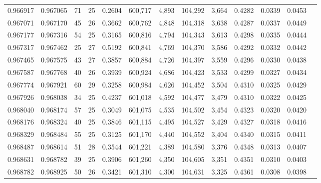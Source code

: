 \begin{tabular}{rrrrrrrrrrrrr}
0.966917 & 0.967065 &    71 &  25 &                                     0.2604 & 600,717 &   4,893 & 104,292 &   3,664 & 0.4282 & 0.0339 & 0.0453 \\
0.967071 & 0.967170 &    45 &  26 &                                     0.3662 & 600,762 &   4,848 & 104,318 &   3,638 & 0.4287 & 0.0337 & 0.0449 \\
0.967177 & 0.967316 &    54 &  25 &                                     0.3165 & 600,816 &   4,794 & 104,343 &   3,613 & 0.4298 & 0.0335 & 0.0444 \\
0.967317 & 0.967462 &    25 &  27 &                                     0.5192 & 600,841 &   4,769 & 104,370 &   3,586 & 0.4292 & 0.0332 & 0.0442 \\
0.967465 & 0.967575 &    43 &  27 &                                     0.3857 & 600,884 &   4,726 & 104,397 &   3,559 & 0.4296 & 0.0330 & 0.0438 \\
0.967587 & 0.967768 &    40 &  26 &                                     0.3939 & 600,924 &   4,686 & 104,423 &   3,533 & 0.4299 & 0.0327 & 0.0434 \\
0.967774 & 0.967921 &    60 &  29 &                                     0.3258 & 600,984 &   4,626 & 104,452 &   3,504 & 0.4310 & 0.0325 & 0.0429 \\
0.967926 & 0.968038 &    34 &  25 &                                     0.4237 & 601,018 &   4,592 & 104,477 &   3,479 & 0.4310 & 0.0322 & 0.0425 \\
0.968040 & 0.968174 &    57 &  25 &                                     0.3049 & 601,075 &   4,535 & 104,502 &   3,454 & 0.4323 & 0.0320 & 0.0420 \\
0.968176 & 0.968324 &    40 &  25 &                                     0.3846 & 601,115 &   4,495 & 104,527 &   3,429 & 0.4327 & 0.0318 & 0.0416 \\
0.968329 & 0.968484 &    55 &  25 &                                     0.3125 & 601,170 &   4,440 & 104,552 &   3,404 & 0.4340 & 0.0315 & 0.0411 \\
0.968487 & 0.968614 &    51 &  28 &                                     0.3544 & 601,221 &   4,389 & 104,580 &   3,376 & 0.4348 & 0.0313 & 0.0407 \\
0.968631 & 0.968782 &    39 &  25 &                                     0.3906 & 601,260 &   4,350 & 104,605 &   3,351 & 0.4351 & 0.0310 & 0.0403 \\
0.968782 & 0.968925 &    50 &  26 &                                     0.3421 & 601,310 &   4,300 & 104,631 &   3,325 & 0.4361 & 0.0308 & 0.0398 \\

\end{tabular}
